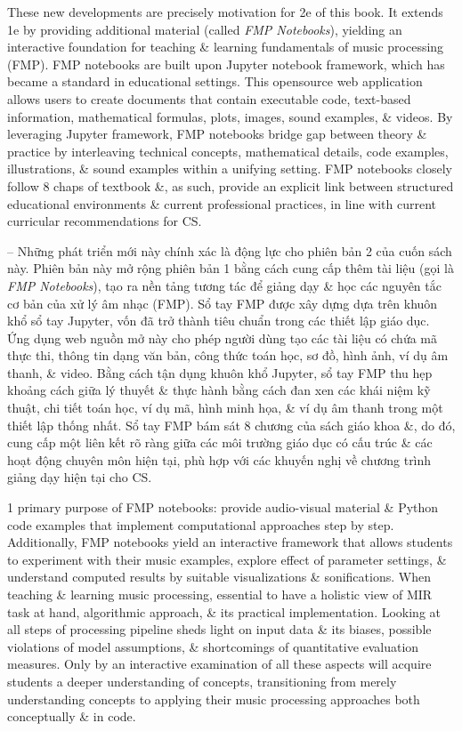 \documentclass{article}
\begin{document}
\begin{itemize}
	These new developments are precisely motivation for 2e of this book. It extends 1e by providing additional material (called {\it FMP Notebooks}), yielding an interactive foundation for teaching \& learning fundamentals of music processing (FMP). FMP notebooks are built upon Jupyter notebook framework, which has became a standard in educational settings. This opensource web application allows users to create documents that contain executable code, text-based information, mathematical formulas, plots, images, sound examples, \& videos. By leveraging Jupyter framework, FMP notebooks bridge gap between theory \& practice by interleaving technical concepts, mathematical details, code examples, illustrations, \& sound examples within a unifying setting. FMP notebooks closely follow 8 chaps of textbook \&, as such, provide an explicit link between structured educational environments \& current professional practices, in line with current curricular recommendations for CS.
	
	-- Những phát triển mới này chính xác là động lực cho phiên bản 2 của cuốn sách này. Phiên bản này mở rộng phiên bản 1 bằng cách cung cấp thêm tài liệu (gọi là {\it FMP Notebooks}), tạo ra nền tảng tương tác để giảng dạy \& học các nguyên tắc cơ bản của xử lý âm nhạc (FMP). Sổ tay FMP được xây dựng dựa trên khuôn khổ sổ tay Jupyter, vốn đã trở thành tiêu chuẩn trong các thiết lập giáo dục. Ứng dụng web nguồn mở này cho phép người dùng tạo các tài liệu có chứa mã thực thi, thông tin dạng văn bản, công thức toán học, sơ đồ, hình ảnh, ví dụ âm thanh, \& video. Bằng cách tận dụng khuôn khổ Jupyter, sổ tay FMP thu hẹp khoảng cách giữa lý thuyết \& thực hành bằng cách đan xen các khái niệm kỹ thuật, chi tiết toán học, ví dụ mã, hình minh họa, \& ví dụ âm thanh trong một thiết lập thống nhất. Sổ tay FMP bám sát 8 chương của sách giáo khoa \&, do đó, cung cấp một liên kết rõ ràng giữa các môi trường giáo dục có cấu trúc \& các hoạt động chuyên môn hiện tại, phù hợp với các khuyến nghị về chương trình giảng dạy hiện tại cho CS.
	
	1 primary purpose of FMP notebooks: provide audio-visual material \& Python code examples that implement computational approaches step by step. Additionally, FMP notebooks yield an interactive framework that allows students to experiment with their music examples, explore effect of parameter settings, \& understand computed results by suitable visualizations \& sonifications. When teaching \& learning music processing, essential to have a holistic view of MIR task at hand, algorithmic approach, \& its practical implementation. Looking at all steps of processing pipeline sheds light on input data \& its biases, possible violations of model assumptions, \& shortcomings of quantitative evaluation measures. Only by an interactive examination of all these aspects will acquire students a deeper understanding of concepts, transitioning from merely understanding concepts to applying their music processing approaches both conceptually \& in code.
	

\end{itemize}
\end{document}

